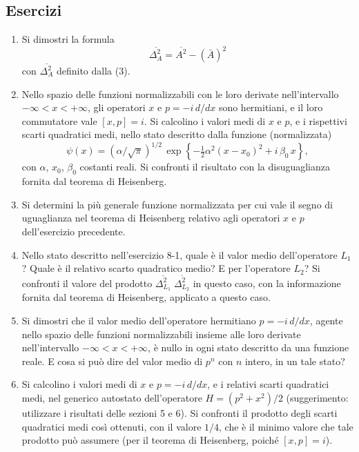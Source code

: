 \documentclass[11pt, a4paper]{book}
\numberwithin{equation}{section}
\newenvironment{esercizi}{\subsection*{Esercizi}\begin{enumerate}}{\end{enumerate}}
\begin{document}
\begin{esercizi}
\item Si dimostri la formula
\[
\overline{\Delta_A^2} = \overline{A^2} - \left(\bar{A}\right)^2
\]
con $\overline{\Delta_A^2}$ definito dalla (3).

\item Nello spazio delle funzioni normalizzabili con le loro derivate
nell'intervallo $-\infty < x < +\infty$, gli operatori $x$ e $p = -i\,d/dx$
sono hermitiani, e il loro commutatore vale $[x, p] = i$.
Si calcolino i valori medi di $x$ e $p$, e i rispettivi scarti quadratici
medi, nello stato descritto dalla funzione (normalizzata)
\[
\psi(x) = (\alpha/\sqrt{\pi})^{1/2}\, \exp\!\left\{-\tfrac{1}{2}\alpha^2(x-x_0)^2 + i\,\beta_0\, x\right\},
\]
con $\alpha$, $x_0$, $\beta_0$ costanti reali. Si confronti il risultato
con la disuguaglianza fornita dal teorema di Heisenberg.

\item Si determini la più generale funzione normalizzata per cui vale
il segno di uguaglianza nel teorema di Heisenberg relativo agli
operatori $x$ e $p$ dell'esercizio precedente.


\item Nello stato descritto nell'esercizio 8-1, quale è il valor
medio dell'operatore $L_1$? Quale è il relativo scarto
quadratico medio? E per l'operatore $L_2$? Si confronti
il valore del prodotto $\overline{\Delta_{L_1}^2}\;\overline{\Delta_{L_2}^2}$ in questo caso, con
la informazione fornita dal teorema di Heisenberg, applicato
a questo caso.

\item Si dimostri che il valor medio dell'operatore hermitiano
$p = -i\,d/dx$, agente nello spazio delle funzioni normalizzabili insieme alle loro derivate nell'intervallo
$-\infty < x < +\infty$, è nullo in ogni stato descritto
da una funzione reale. E cosa si può dire del valor medio
di $p^n$ con $n$ intero, in un tale stato?

\item Si calcolino i valori medi di $x$ e $p = -i\,d/dx$, e i relativi scarti quadratici medi, nel generico autostato dell'operatore
$H = (p^2 + x^2)/2$ (suggerimento: utilizzare i risultati
delle sezioni 5 e 6). Si confronti il prodotto degli scarti quadratici medi così ottenuti, con il valore $1/4$, che è il minimo valore
che tale prodotto può assumere (per il teorema di Heisenberg,
poiché $[x, p] = i$).
\end{esercizi}
\end{document}

